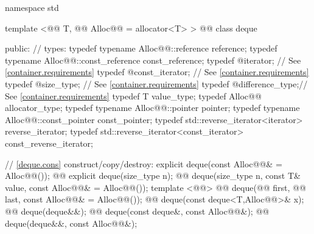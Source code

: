 \documentclass[american,twoside]{book}
\begin{document}
\begin{codeblock}
namespace std {
  template <@@ T, @@ Alloc@@ = allocator<T> >
  @@
  class deque {
  public:
    // types:
    typedef typename Alloc@@::reference         reference;
    typedef typename Alloc@@::const_reference   const_reference;
    typedef @\impdef@                iterator;       // See \ref{container.requirements}
    typedef @\impdef@                const_iterator; // See \ref{container.requirements}
    typedef @\impdef@                size_type;      // See \ref{container.requirements}
    typedef @\impdef@                difference_type;// See \ref{container.requirements}
    typedef T                                     value_type;
    typedef Alloc@@                             allocator_type;
    typedef typename Alloc@@::pointer           pointer;
    typedef typename Alloc@@::const_pointer     const_pointer;
    typedef std::reverse_iterator<iterator>       reverse_iterator;
    typedef std::reverse_iterator<const_iterator> const_reverse_iterator;

    // \ref{deque.cons} construct/copy/destroy:
    explicit deque(const Alloc@@& = Alloc@@());
    @@ explicit deque(size_type n);
    @@ 
      deque(size_type n, const T& value, const Alloc@@& = Alloc@@());
    template <@@>
      @@ 
      deque(@@ first, @@ last, const Alloc@@& = Alloc@@());
    @@ deque(const deque<T,Alloc@@>& x);
    @@ deque(deque&&);
    @@ deque(const deque&, const Alloc@@&);
    @@ deque(deque&&, const Alloc@@&);

}}
\end{codeblock}
\end{document}
